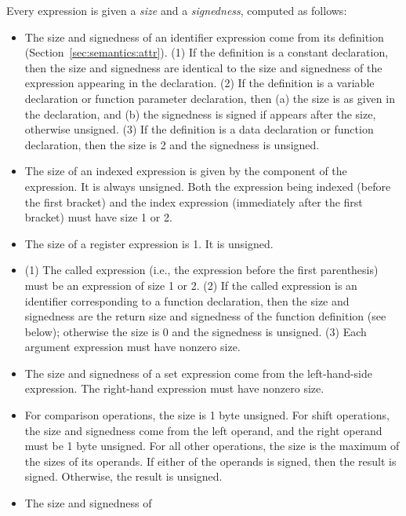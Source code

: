 \documentclass[10pt]{article}
\begin{document}
 Every expression is given a \emph{size} and a
\emph{signedness}, computed as follows:
%
\begin{itemize}
%
\item {} The size and signedness of an identifier
  expression come from its definition
  (Section~\ref{sec:semantics:attr}).  (1) If the definition is a
  constant declaration, then the size and signedness are identical to
  the size and signedness of the expression appearing in the
  declaration.  (2) If the definition is a variable declaration or
  function parameter declaration, then (a) the size is as given in the
  declaration, and (b) the signedness is signed if  appears
  after the size, otherwise unsigned.  (3) If the definition is a data
  declaration or function declaration, then the size is 2 and the
  signedness is unsigned.
%
\item {} The size of an indexed expression
  is given by the  component of the expression.  It is
  always unsigned.  Both the expression being indexed (before the
  first bracket) and the index expression (immediately after the first
  bracket) must have size 1 or 2.
%
\item {} The size of a register expression
  is 1.  It is unsigned.
%
\item {} (1) The called expression (i.e., the
  expression before the first parenthesis) must be an expression of
  size 1 or 2.  (2) If the called expression is an identifier
  corresponding to a function declaration, then the size and
  signedness are the return size and signedness of the function
  definition (see below); otherwise the size is 0 and the signedness
  is unsigned.  (3) Each argument expression must have nonzero size.
%
\item {} The size and signedness of a set
  expression come from the left-hand-side expression.  The right-hand
  expression must have nonzero size.
%
\item {}  For comparison
  operations, the size is 1 byte unsigned.  For shift operations, the
  size and signedness come from the left operand, and the right
  operand must be 1 byte unsigned.  For all other operations, the size
  is the maximum of the sizes of its operands.  If either of the
  operands is signed, then the result is signed.  Otherwise, the
  result is unsigned.
%
\item {} The size and signedness of

\end{itemize}
\end{document}
